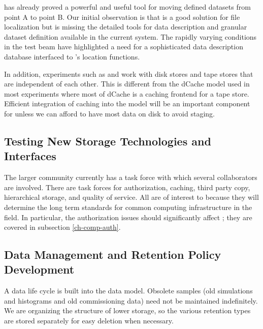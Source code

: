  has already proved a powerful and useful tool for moving defined datasets from point A to point B.  Our initial observation is that  is a good solution for file localization but is missing the detailed tools for data description and granular dataset definition available in the current  system.  The rapidly varying conditions in the test beam have highlighted a need for a sophisticated data description database interfaced to 's location functions. 

In addition,    experiments such as  and  work with disk stores and tape stores that are independent of each other.  This is different from the dCache model used in most  experiments where most of dCache is a caching frontend for a tape store.  Efficient integration of caching into the  model will be an important component for  unless  we can afford to have most data on disk to avoid staging.


\subsection{Testing New Storage Technologies and Interfaces}

The larger  community\cite{Berzano:2018xaa} currently has a  task force
 with which several  collaborators are involved. There are task forces for authorization, caching, third party copy, hierarchical storage, and quality of service. All are of interest to  because they will determine the long term standards for common computing infrastructure in the field. 
In particular, the authorization issues should significantly affect ; they are covered in subsection \ref{ch-comp-auth}.


\subsection{Data Management and Retention Policy Development}



A data life cycle is built into the  data model.  Obsolete samples (old simulations and histograms and old commissioning data) need not be maintained indefinitely.  
We are organizing the structure of lower storage, so the various retention types are stored separately for easy deletion when necessary.  

